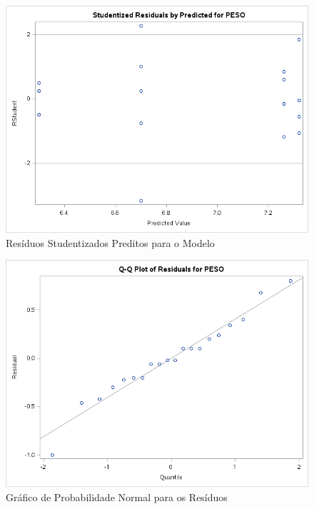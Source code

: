 \documentclass[a4paper,12pt,notitlepage]{article}
\begin{document}
\begin{figure}[!htb]
    \centering
    \includegraphics[scale=0.8]{res_student}
    \caption{Resíduos Studentizados Preditos para o Modelo}
    \label{grafico:res_student}
\end{figure}

\begin{figure}[!htb]
    \centering
    \includegraphics[scale=0.8]{qq-residuos}
    \caption{Gráfico de Probabilidade Normal para os Resíduos}
    \label{grafico:res_qqplot}
\end{figure}
\end{document}
